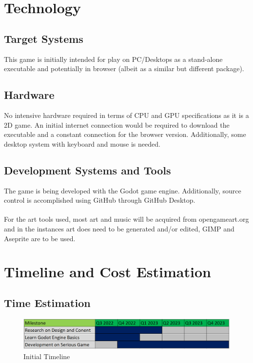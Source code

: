 \documentclass[a4paper]{scrreprt}
\begin{document}
\chapter{Technology}

\section{Target Systems}
This game is initially intended for play on PC/Desktops as a stand-alone executable and potentially in browser (albeit as a similar but different package).

\section{Hardware}
No intensive hardware required in terms of CPU and GPU specifications as it is a 2D game. An initial internet connection would be required to download the executable and a constant connection for the browser version. Additionally, some desktop system with keyboard and mouse is needed.

\section{Development Systems and Tools}
The game is being developed with the Godot game engine. Additionally, source control is accomplished using GitHub through GitHub Desktop.
\\\\
For the art tools used, most art and music will be acquired from opengameart.org and in the instances art does need to be generated and/or edited, GIMP and Aseprite are to be used.


\chapter{Timeline and Cost Estimation}

\section{Time Estimation}

\begin{figure}[h]
\includegraphics[scale=0.5]{gantt.PNG}
\caption{\label{fig:tl} Initial Timeline}
\end{figure}
\end{document}
